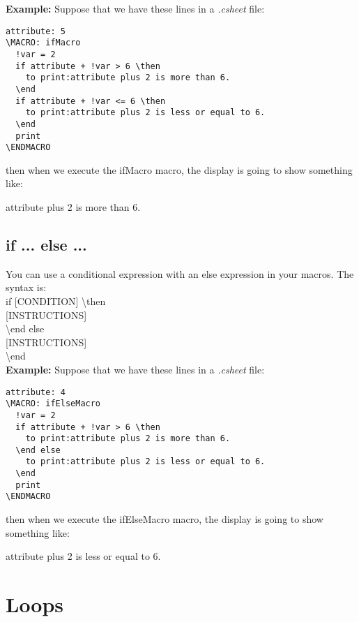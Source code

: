 \documentclass[11pt,a4paper,openright,oneside]{book}
\newenvironment{ex}
{
  \setlength{\parindent}{0cm}
  \large \textbf{Example:} \normalsize 
}
{}
\begin{document}
\begin{ex} Suppose that we have these lines in a \textit{.csheet} file:
  \begin{lstlisting}
attribute: 5
\MACRO: ifMacro
  !var = 2
  if attribute + !var > 6 \then
    to print:attribute plus 2 is more than 6.
  \end
  if attribute + !var <= 6 \then
    to print:attribute plus 2 is less or equal to 6. 
  \end
  print
\ENDMACRO
  \end{lstlisting}
then when we execute the \textsf{ifMacro} macro, the display is going to show something like:
\vspace{5px}

\textsf{attribute plus 2 is more than 6.}

\end{ex}

\subsection{\textsf{if ... else ...}}

You can use a conditional expression with an \textsf{else} expression in your macros. The syntax is: \vspace{5px} \\
\textsf{if \textsc{\scriptsize[CONDITION]} \textbackslash then} \\
\textsc{\scriptsize[INSTRUCTIONS]} \\
\textsf{\textbackslash end else} \\
\textsc{\scriptsize[INSTRUCTIONS]} \\
\textsf{\textbackslash end} \\

\begin{ex} Suppose that we have these lines in a \textit{.csheet} file:
  \begin{lstlisting}
attribute: 4
\MACRO: ifElseMacro
  !var = 2
  if attribute + !var > 6 \then
    to print:attribute plus 2 is more than 6.
  \end else
    to print:attribute plus 2 is less or equal to 6. 
  \end
  print
\ENDMACRO
  \end{lstlisting}
then when we execute the \textsf{ifElseMacro} macro, the display is going to show something like:
\vspace{5px}

\textsf{attribute plus 2 is less or equal to 6.}

\end{ex}

\section{Loops}
\end{document}

